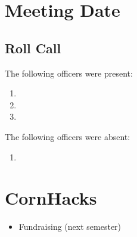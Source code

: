 \section*{Meeting Date}

\subsection{Roll Call}

The following officers were present:

\begin{enumerate}
    \item \president
    \item \primaryprogrammer
    \item \secretary
    
\end{enumerate}

The following officers were absent:

\begin{enumerate}
    \item \tresurer
\end{enumerate}

\section{CornHacks}
\begin{itemize}
    \item Fundraising (next semester)
\end{itemize}


